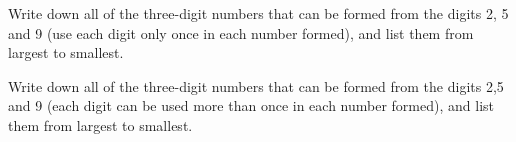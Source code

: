 \begin{exercises}
\begin{questions}
        \Question[2] Write down all of the three-digit numbers that can be formed from the digits 2, 5 and 9 (use each digit only once in each number formed), and list them from largest to smallest.
            \begin{solutionordottedlines}[1in]
            \end{solutionordottedlines}
        \Question[2] Write down all of the three-digit numbers that can be formed from the digits 2,5 and 9 (each digit can be used more than once in each number formed), and list them from largest to smallest.
            \begin{solutionordottedlines}[1in]
            \end{solutionordottedlines}
    \end{questions}
\end{exercises}
